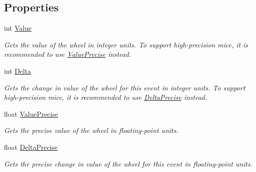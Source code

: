\subsection*{Properties}
\begin{DoxyCompactItemize}
\item 
int \hyperlink{class_open_t_k_1_1_input_1_1_mouse_wheel_event_args_a34daefff9cfbd400ac5d6af00a8118c3}{Value}
\begin{DoxyCompactList}\small\item\em Gets the value of the wheel in integer units. To support high-\/precision mice, it is recommended to use \hyperlink{class_open_t_k_1_1_input_1_1_mouse_wheel_event_args_a924698cde619be6ceb51cd318a990b55}{Value\-Precise} instead. \end{DoxyCompactList}\item 
int \hyperlink{class_open_t_k_1_1_input_1_1_mouse_wheel_event_args_aef5f641060a53167289fec501ac8f458}{Delta}
\begin{DoxyCompactList}\small\item\em Gets the change in value of the wheel for this event in integer units. To support high-\/precision mice, it is recommended to use \hyperlink{class_open_t_k_1_1_input_1_1_mouse_wheel_event_args_a9ba689417b32b99c1971aa541d8765e2}{Delta\-Precise} instead. \end{DoxyCompactList}\item 
float \hyperlink{class_open_t_k_1_1_input_1_1_mouse_wheel_event_args_a924698cde619be6ceb51cd318a990b55}{Value\-Precise}
\begin{DoxyCompactList}\small\item\em Gets the precise value of the wheel in floating-\/point units. \end{DoxyCompactList}\item 
float \hyperlink{class_open_t_k_1_1_input_1_1_mouse_wheel_event_args_a9ba689417b32b99c1971aa541d8765e2}{Delta\-Precise}
\begin{DoxyCompactList}\small\item\em Gets the precise change in value of the wheel for this event in floating-\/point units. \end{DoxyCompactList}\end{DoxyCompactItemize}


